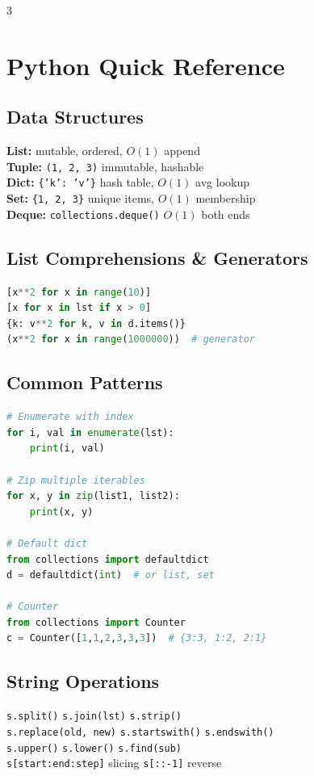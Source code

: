 \documentclass[7pt,landscape]{extarticle}
\newcommand{\code}[1]{\texttt{\fontsize{6pt}{7pt}\selectfont#1}}
\begin{document}
\begin{multicols*}{3}
\section*{Python Quick Reference}

\subsection*{Data Structures}
\textbf{List:} \code{[1, 2, 3]} mutable, ordered, $O(1)$ append \\
\textbf{Tuple:} \code{(1, 2, 3)} immutable, hashable \\
\textbf{Dict:} \code{\{'k': 'v'\}} hash table, $O(1)$ avg lookup \\
\textbf{Set:} \code{\{1, 2, 3\}} unique items, $O(1)$ membership \\
\textbf{Deque:} \code{collections.deque()} $O(1)$ both ends

\subsection*{List Comprehensions \& Generators}
\begin{lstlisting}[language=Python]
[x**2 for x in range(10)]
[x for x in lst if x > 0]
{k: v**2 for k, v in d.items()}
(x**2 for x in range(1000000))  # generator
\end{lstlisting}

\subsection*{Common Patterns}
\begin{lstlisting}[language=Python]
# Enumerate with index
for i, val in enumerate(lst):
    print(i, val)

# Zip multiple iterables
for x, y in zip(list1, list2):
    print(x, y)

# Default dict
from collections import defaultdict
d = defaultdict(int)  # or list, set

# Counter
from collections import Counter
c = Counter([1,1,2,3,3,3])  # {3:3, 1:2, 2:1}
\end{lstlisting}

\subsection*{String Operations}
\code{s.split()} \hfill \code{s.join(lst)} \hfill \code{s.strip()} \\
\code{s.replace(old, new)} \hfill \code{s.startswith()} \hfill \code{s.endswith()} \\
\code{s.upper()} \hfill \code{s.lower()} \hfill \code{s.find(sub)} \\
\code{s[start:end:step]} \hfill slicing \hfill \code{s[::-1]} reverse


\end{multicols*}
\end{document}
